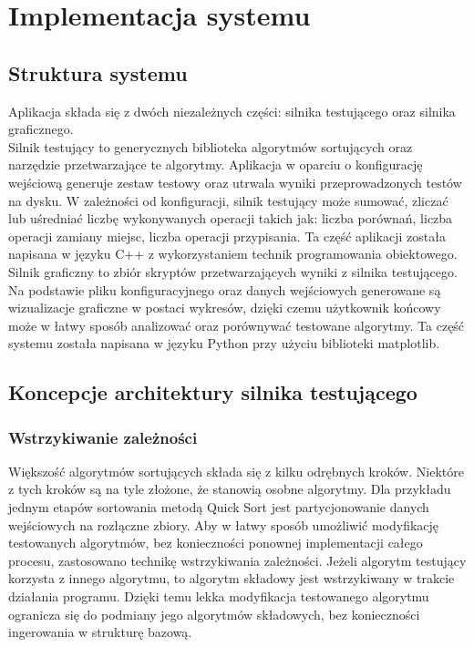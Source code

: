 \chapter{Implementacja systemu}
\thispagestyle{chapterBeginStyle}

\section{Struktura systemu}
Aplikacja składa się z dwóch niezależnych części: silnika testującego oraz silnika graficznego.\\

Silnik testujący to generycznych biblioteka algorytmów sortujących oraz narzędzie przetwarzające
te algorytmy. Aplikacja w oparciu o konfigurację wejściową generuje zestaw testowy oraz utrwala
wyniki przeprowadzonych testów na dysku. W zależności od konfiguracji, silnik testujący może
sumować, zliczać lub uśredniać liczbę wykonywanych operacji takich jak: liczba porównań, liczba
operacji zamiany miejsc, liczba operacji przypisania. Ta część aplikacji została napisana w języku
C++ z wykorzystaniem technik programowania obiektowego.\\

Silnik graficzny to zbiór skryptów przetwarzających wyniki z silnika testującego. Na podstawie pliku
konfiguracyjnego oraz danych wejściowych generowane są wizualizacje graficzne w postaci wykresów, dzięki
czemu użytkownik końcowy może w łatwy sposób analizować oraz porównywać testowane algorytmy. Ta część
systemu została napisana w języku Python przy użyciu biblioteki matplotlib.

\section{Koncepcje architektury silnika testującego}

\subsection{Wstrzykiwanie zależności}
Większość algorytmów sortujących składa się z kilku odrębnych kroków. Niektóre z tych kroków są na tyle
złożone, że stanowią osobne algorytmy. Dla przykładu jednym etapów sortowania metodą Quick Sort
jest partycjonowanie danych wejściowych na rozłączne zbiory. Aby w łatwy sposób umożliwić modyfikację
testowanych algorytmów, bez konieczności ponownej implementacji całego procesu, zastosowano technikę
wstrzykiwania zależności. Jeżeli algorytm testujący korzysta z innego algorytmu, to algorytm składowy
jest wstrzykiwany w trakcie działania programu. Dzięki temu lekka modyfikacja testowanego algorytmu
ogranicza się do podmiany jego algorytmów składowych, bez konieczności ingerowania w strukturę bazową.

